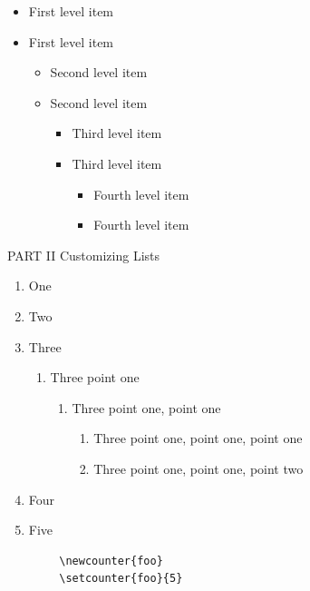 \documentclass{article}
\begin{document}
	\begin{itemize}
		\item First level item
		\item First level item
		\begin{itemize}
			\item Second level item
			\item Second level item
			\begin{itemize}
				\item Third level item
				\item Third level item
				\begin{itemize}
					\item Fourth level item
					\item Fourth level item
				\end{itemize}
			\end{itemize}
		\end{itemize}
	\end{itemize}
	
	PART II
	Customizing Lists 
	
	\renewcommand{\labelenumii}{\arabic{enumi}.\arabic{enumii}}
	\renewcommand{\labelenumiii}{\arabic{enumi}.\arabic{enumii}.\arabic{enumiii}}
	\renewcommand{\labelenumiv}{\arabic{enumi}.\arabic{enumii}.\arabic{enumiii}.\arabic{enumiv}}
	
	\begin{enumerate}
		\item One
		\item Two
		\item Three
		\begin{enumerate}
			\item Three point one
			\begin{enumerate}
				\item Three point one, point one
				\begin{enumerate}
					\item Three point one, point one, point one
					\item Three point one, point one, point two
				\end{enumerate}
			\end{enumerate}
		\end{enumerate}
		\item Four
		\item Five
	\end{enumerate}
	
	\begin{verbatim}
		\newcounter{foo}
		\setcounter{foo}{5}    
	\end{verbatim}
	\setcounter{foo}{5} 
	
\end{document}
